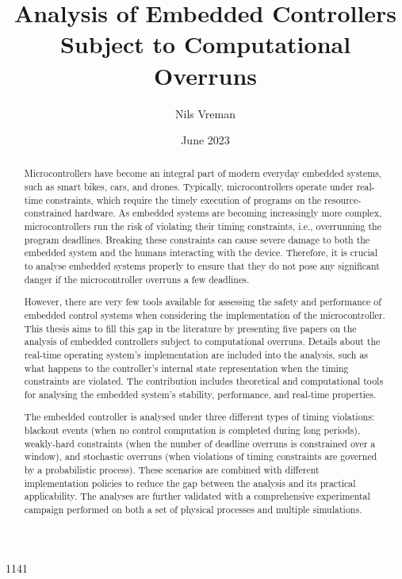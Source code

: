 \date{June 2023}
\num{1141}
\author{Nils Vreman}
\sponsor{}
\title{Analysis of Embedded Controllers Subject to Computational Overruns}
\classification{}
\supplement{}
\security{}
\recipient{}
\begin{abstract}
    \vspace{-4mm}
    \normalsize
Microcontrollers have become an integral part of modern everyday embedded systems, such as smart bikes, cars, and drones.
Typically, microcontrollers operate under real-time constraints, which require the timely execution of programs on the resource-constrained hardware.
As embedded systems are becoming increasingly more complex, microcontrollers run the risk of violating their timing constraints, i.e., overrunning the program deadlines.
Breaking these constraints can cause severe damage to both the embedded system and the humans interacting with the device.
Therefore, it is crucial to analyse embedded systems properly to ensure that they do not pose any significant danger if the microcontroller overruns a few deadlines.

However, there are very few tools available for assessing the safety and performance of embedded control systems when considering the implementation of the microcontroller.
This thesis aims to fill this gap in the literature by presenting five papers on the analysis of embedded controllers subject to computational overruns.
Details about the real-time operating system's implementation are included into the analysis, such as what happens to the controller's internal state representation when the timing constraints are violated.
The contribution includes theoretical and computational tools for analysing the embedded system's stability, performance, and real-time properties.

The embedded controller is analysed under three different types of timing violations: blackout events (when no control computation is completed during long periods), weakly-hard constraints (when the number of deadline overruns is constrained over a window), and stochastic overruns (when violations of timing constraints are governed by a probabilistic process).
These scenarios are combined with different implementation policies to reduce the gap between the analysis and its practical applicability.
The analyses are further validated with a comprehensive experimental campaign performed on both a set of physical processes and multiple simulations.


\end{abstract}
